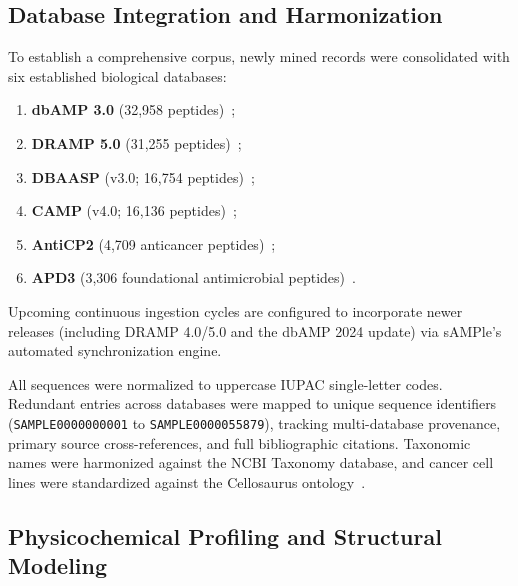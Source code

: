 \documentclass[unnumsec,webpdf,contemporary,large]{oup-authoring-template}%
\begin{document}
\subsection{Database Integration and Harmonization}

To establish a comprehensive corpus, newly mined records were consolidated with six established biological databases:
\begin{enumerate}
    \item \textbf{dbAMP 3.0} (32,958 peptides)~\cite{yao2025dbamp};
    \item \textbf{DRAMP 5.0} (31,255 peptides)~\cite{ma2026dramp};
    \item \textbf{DBAASP} (v3.0; 16,754 peptides)~\cite{pirtskhalava2021dbaasp};
    \item \textbf{CAMP} (v4.0; 16,136 peptides)~\cite{wadhwa2023camp};
    \item \textbf{AntiCP2} (4,709 anticancer peptides)~\cite{agrawal2021anticp2};
    \item \textbf{APD3} (3,306 foundational antimicrobial peptides)~\cite{wang2016apd3}.
\end{enumerate}
Upcoming continuous ingestion cycles are configured to incorporate newer releases (including DRAMP 4.0/5.0 and the dbAMP 2024 update) via sAMPle's automated synchronization engine.

All sequences were normalized to uppercase IUPAC single-letter codes. Redundant entries across databases were mapped to unique sequence identifiers (\texttt{SAMPLE0000000001} to \texttt{SAMPLE0000055879}), tracking multi-database provenance, primary source cross-references, and full bibliographic citations. Taxonomic names were harmonized against the NCBI Taxonomy database, and cancer cell lines were standardized against the Cellosaurus ontology~\cite{bairoch2018cellosaurus}.

\subsection{Physicochemical Profiling and Structural Modeling}
\end{document}
